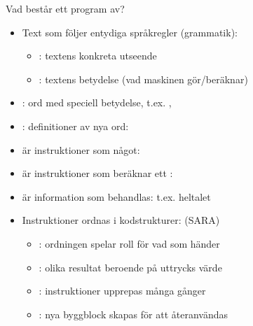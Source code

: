 \begin{Slide}{Vad består ett program av?}
\begin{itemize}
\item Text som följer entydiga språkregler (grammatik):
\begin{itemize}
\item {}: textens konkreta utseende
\item {}: textens betydelse (vad maskinen gör/beräknar)
\end{itemize}
\item {}: ord med speciell betydelse, t.ex. , 
\item {}: definitioner av nya ord: 
\item {} är instruktioner som  något: 
\item {} är instruktioner som beräknar ett : 
\item {} är information som behandlas: t.ex. heltalet 
\item Instruktioner ordnas i kodstrukturer: (SARA)
\begin{itemize}
  \item {}: ordningen spelar roll för vad som händer
  \item {}: olika resultat beroende på uttrycks värde
  \item {}: instruktioner upprepas många gånger
  \item {}: nya byggblock skapas för att återanvändas
\end{itemize}
\end{itemize}
\end{Slide}

